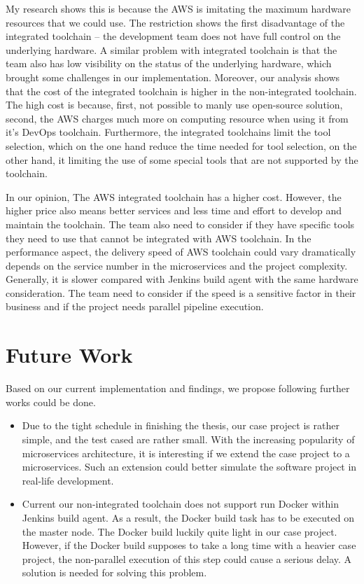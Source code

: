 My research shows this is because the AWS is imitating the maximum hardware resources that we could use. The restriction shows the first disadvantage of the integrated toolchain -- the development team does not have full control on the underlying hardware. A similar problem with integrated toolchain is that the team also has low visibility on the status of the underlying hardware, which brought some challenges in our implementation. Moreover, our analysis shows that the cost of the integrated toolchain is higher in the non-integrated toolchain. The high cost is because, first, not possible to manly use open-source solution, second, the AWS charges much more on computing resource when using it from it's DevOps toolchain.
Furthermore, the integrated toolchains limit the tool selection, which on the one hand reduce the time needed for tool selection, on the other hand, it limiting the use of some special tools that are not supported by the toolchain.
\par
In our opinion, The AWS integrated toolchain has a higher cost. However, the higher price also means better services and less time and effort to develop and maintain the toolchain. The team also need to consider if they have specific tools they need to use that cannot be integrated with AWS toolchain. In the performance aspect, the delivery speed of AWS toolchain could vary dramatically depends on the service number in the microservices and the project complexity. Generally, it is slower compared with Jenkins build agent with the same hardware consideration. The team need to consider if the speed is a sensitive factor in their business and if the project needs parallel pipeline execution.
\section{Future Work}
Based on our current implementation and findings, we propose following further works could be done.
\begin{itemize}
    \item Due to the tight schedule in finishing the thesis, our case project is rather simple, and the test cased are rather small.  With the increasing popularity of microservices architecture, it is interesting if we extend the case project to a microservices. Such an extension could better simulate the software project in real-life development.
    \item Current our non-integrated toolchain does not support run Docker within Jenkins build agent. As a result, the Docker build task has to be executed on the master node. The Docker build luckily quite light in our case project. However, if the Docker build supposes to take a long time with a heavier case project, the non-parallel execution of this step could cause a serious delay. A solution is needed for solving this problem.
\end{itemize}

